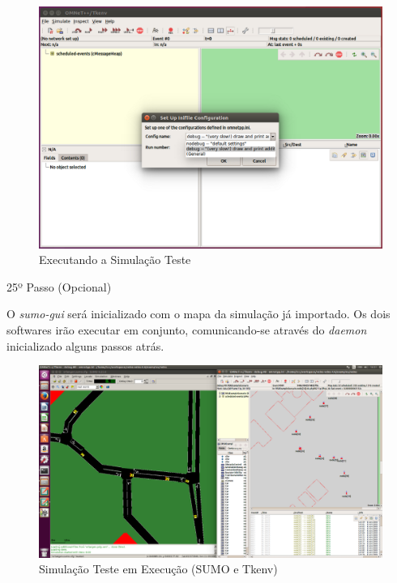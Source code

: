 \documentclass[
12pt,				%
openright,			%
oneside,			%
a4paper,			%
brazil,				%
]{abntex2}
\begin{document}
{\begin{anexosenv}
                \begin{figure} [H]
	                \centering
	                \includegraphics[scale=.28]{figuras/aneB/67TkenvDebug}
	                \caption{\label{fig_67}Executando a Simulação Teste}
                \end{figure}
                    
        	
            	\begin{description}
	                \item[25º Passo (Opcional)]
	            \end{description}
	            \par O \textit{sumo-gui} será inicializado com o mapa da simulação já importado. Os dois softwares irão executar em conjunto, comunicando-se através do \textit{daemon} inicializado alguns passos atrás.
		            
                \begin{figure} [H]
	                \centering
	                \includegraphics[scale=.32]{figuras/aneB/68TkenvESumo}
	                \caption{\label{fig_68}Simulação Teste em Execução (SUMO e Tkenv)}
                \end{figure}
                

\end{anexosenv}}
\end{document}
